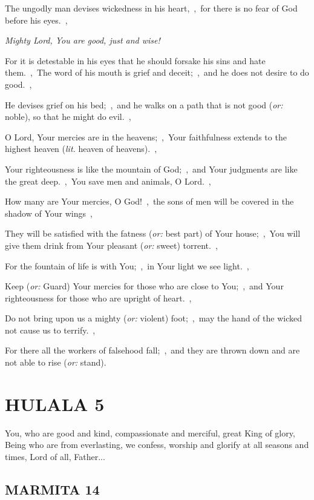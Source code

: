 \documentclass[12pt,twoside,a5paper]{article}
\newcommand{\hulala}[1]{\section*{HULALA {#1}}}
\newcommand{\marmita}[1]{\subsection*{MARMITA {#1}}}
\newcommand{\qanona}[1]{{\liturgicalhint{Qanona.} \emph{#1}}}
\newcommand{\slota}[1]{\liturgicalhint{Slota.} #1}
\newcommand{\translationoption}[1]{\emph{or:} #1}
\newcommand{\translationliteral}[1]{\emph{lit.} #1}
\begin{document}
\begin{normalparskip}
  The ungodly man devises wickedness in his heart,~\sep\ for there is no fear of God before his eyes.~\sep

  \qanona{Mighty Lord, You are good, just and wise!}

  For it is detestable in his eyes that he should forsake his sins and hate them.~\sep\ The word of his mouth is grief and deceit;~\sep\ and he does not desire to do good.~\sep

  He devises grief on his bed;~\sep\ and he walks on a path that is not good (\translationoption{noble}), so that he might do evil.~\sep

  O Lord, Your mercies are in the heavens;~\sep\ Your faithfulness extends to the highest heaven (\translationliteral{heaven of heavens}).~\sep

  Your righteousness is like the mountain of God;~\sep\ and Your judgments are like the great deep.~\sep\ You save men and animals, O Lord.~\sep

  How many are Your mercies, O God!~\sep\ the sons of men will be covered in the shadow of Your wings~\sep

  They will be satisfied with the fatness (\translationoption{best part}) of Your house;~\sep\ You will give them drink from Your pleasant (\translationoption{sweet}) torrent.~\sep

  For the fountain of life is with You;~\sep\ in Your light we see light.~\sep

  Keep (\translationoption{Guard}) Your mercies for those who are close to You;~\sep\ and Your righteousness for those who are upright of heart.~\sep

  Do not bring upon us a mighty (\translationoption{violent}) foot;~\sep\ may the hand of the wicked not cause us to terrify.~\sep

  For there all the workers of falsehood fall;~\sep\ and they are thrown down and are not able to rise (\translationoption{stand}).
\end{normalparskip}


\hulala{5}

\slota{You, who are good and kind, compassionate and merciful, great King of glory, Being who are from everlasting, we confess, worship and glorify at all seasons and times, Lord of all, Father...}

\marmita{14}
\end{document}
